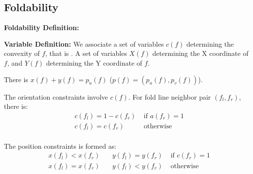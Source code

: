 \subsection{Foldability}
\textbf{Foldability Definition: }

\textbf{Variable Definition: }
We associate a set of variables $c(f)$ determining the convexity of $f$, that is . A set of variables $X(f)$ determining the X coordinate of $f$, and $Y(f)$ determining the Y coordinate of $f$.

There is $x(f) + y(f) = p_u(f)$ ($p(f) = (p_u(f), p_v(f))$).

The orientation constraints involve $c(f)$. For fold line neighbor pair $(f_l, f_r)$, there is:
\begin{equation}
  \begin{aligned}
    & c(f_l) = 1 - c(f_r) & \text{ if } a(f_r) = 1 \\
    & c(f_l) = c(f_r) & \text{ otherwise } \\
  \end{aligned}
\end{equation}

The position constraints is formed as:
\begin{equation}
  \begin{aligned}
    & x(f_l) < x(f_r) \quad & y(f_l) = y(f_r) & \text{ if } c(f_r) = 1 \\
    & x(f_l) = x(f_r) \quad & y(f_l) < y(f_r) & \text{ otherwise } \\
  \end{aligned}
\end{equation}
